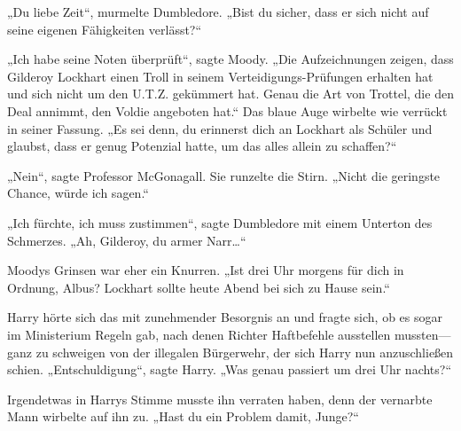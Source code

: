 „Du liebe Zeit“, murmelte Dumbledore. „Bist du sicher, dass er sich nicht auf seine eigenen Fähigkeiten verlässt?“

„Ich habe seine Noten überprüft“, sagte Moody. „Die Aufzeichnungen zeigen, dass Gilderoy Lockhart einen Troll in seinem Verteidigungs-Prüfungen erhalten hat und sich nicht um den U.T.Z. gekümmert hat. Genau die Art von Trottel, die den Deal annimmt, den Voldie angeboten hat.“ Das blaue Auge wirbelte wie verrückt in seiner Fassung. „Es sei denn, du erinnerst dich an Lockhart als Schüler und glaubst, dass er genug Potenzial hatte, um das alles allein zu schaffen?“

„Nein“, sagte Professor McGonagall. Sie runzelte die Stirn. „Nicht die geringste Chance, würde ich sagen.“

„Ich fürchte, ich muss zustimmen“, sagte Dumbledore mit einem Unterton des Schmerzes. „Ah, Gilderoy, du armer Narr…“

Moodys Grinsen war eher ein Knurren. „Ist drei Uhr morgens für dich in Ordnung, Albus? Lockhart sollte heute Abend bei sich zu Hause sein.“

Harry hörte sich das mit zunehmender Besorgnis an und fragte sich, ob es sogar im Ministerium Regeln gab, nach denen Richter Haftbefehle ausstellen mussten—ganz zu schweigen von der illegalen Bürgerwehr, der sich Harry nun anzuschließen schien.
„Entschuldigung“, sagte Harry. „Was genau passiert um drei Uhr nachts?“

Irgendetwas in Harrys Stimme musste ihn verraten haben, denn der vernarbte Mann wirbelte auf ihn zu. „Hast du ein Problem damit, Junge?“

